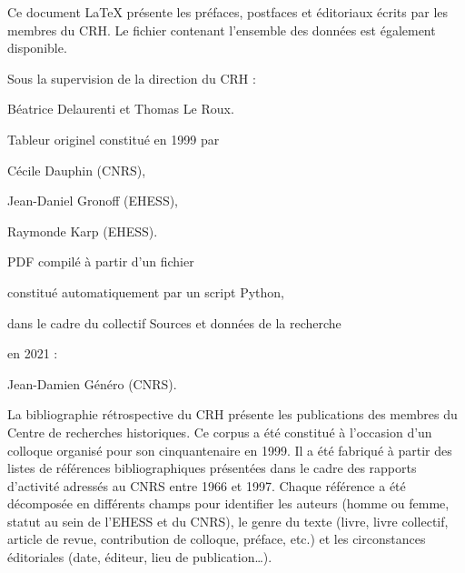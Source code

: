 \documentclass{article}
\begin{document}

\newpage
\thispagestyle{empty}

\begin{center}
	\begin{itshape}
		
		Ce document \LaTeX{} présente les préfaces, postfaces et éditoriaux écrits par les membres du CRH. Le fichier  contenant l'ensemble des données est également disponible.
		
		\bigskip
		
		Sous la supervision de la direction du CRH :
		
		Béatrice Delaurenti et Thomas Le Roux.
		
		\medskip
		
		Tableur originel constitué en 1999 par
		
		\medskip
		
		Cécile Dauphin (CNRS),
		
		Jean-Daniel Gronoff (EHESS),
		
		Raymonde Karp (EHESS).
		
		\bigskip
		
		PDF compilé à partir d'un fichier 
		
		constitué automatiquement par un script Python,
		
		dans le cadre du collectif \og Sources et données de la recherche \fg
		
		en 2021 :
		
		\medskip
		
		Jean-Damien Généro (CNRS).
		
		\bigskip
		
		La bibliographie rétrospective du CRH présente les publications des membres du Centre de recherches historiques. Ce corpus a été constitué à l’occasion d’un colloque organisé pour son cinquantenaire en 1999. Il a été fabriqué à partir des listes de références bibliographiques présentées dans le cadre des rapports d’activité adressés au CNRS entre 1966 et 1997. Chaque référence a été décomposée en différents champs pour identifier les auteurs (homme ou femme, statut au sein de l’EHESS et du CNRS), le genre du texte (livre, livre collectif, article de revue, contribution de colloque, préface, etc.) et les circonstances éditoriales (date, éditeur, lieu de publication…). 
		
		\bigskip
		

\end{itshape}
\end{center}
\end{document}

